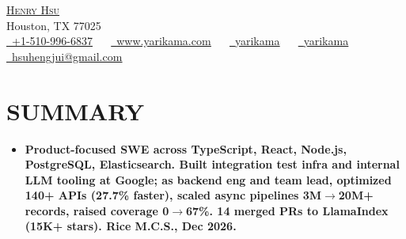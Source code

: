 \documentclass[letterpaper,11pt]{article}
\newcommand{\mylocation}{Houston, TX 77025}
\newcommand{\resumeEntryListStart}{\begin{itemize}[leftmargin=0.0in, label={}]}
\newcommand{\resumeEntryListEnd}{\end{itemize}}
\begin{document}
\begin{center}
  {\Huge \scshape \href{https://www.yarikama.com/}{{Henry Hsu}}} \\
  {\small\color{gray} \mylocation} \\
  \href{tel:+1-510-996-6837}{\raisebox{-0.2\height}\faPhone\  \underline{+1-510-996-6837}} ~~
  \href{https://www.yarikama.com/}{\raisebox{-0.2\height}\faGlobe\ \underline{www.yarikama.com}} ~~
  \href{https://www.linkedin.com/in/yarikama/}{\raisebox{-0.2\height}\faLinkedin\ \underline{yarikama}}  ~~
  \href{https://www.github.com/yarikama}{\raisebox{-0.2\height}\faGithub\ \underline{yarikama}} ~~
  \href{mailto:hsuhengjui@gmail.com}{\raisebox{-0.2\height}\faEnvelope\  \underline{hsuhengjui@gmail.com}} ~~
\end{center}

\vspace{-12pt}

\section{SUMMARY}
\resumeEntryListStart
\item\small{\textbf{Product-focused SWE across \textbf{TypeScript}, \textbf{React}, \textbf{Node.js}, \textbf{PostgreSQL}, \textbf{Elasticsearch}. Built integration test infra and internal LLM tooling at \textbf{Google}; as backend eng and team lead, optimized \textbf{140+} APIs (\textbf{27.7\%} faster), scaled async pipelines 3M$\to$\textbf{20M+} records, raised coverage 0$\to$\textbf{67\%}. \textbf{14} merged PRs to \textbf{LlamaIndex} (\textbf{15K+} stars). Rice M.C.S., \textbf{Dec 2026}.}}
\resumeEntryListEnd

\end{document}
